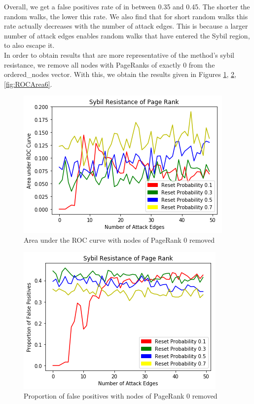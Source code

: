 \documentclass[sigconf]{acmart}
\theoremstyle{definition}
\begin{document}
\noindent Overall, we get a false positives rate of in between 0.35 and 0.45. The shorter the random walks, the lower this rate. We also find that for short random walks this rate actually decreases with the number of attack edges. This is because a larger number of attack edges enables random walks that have entered the Sybil region, to also escape it. \vspace{1em}\\

\noindent In order to obtain results that are more representative of the method's sybil resistance, we remove all nodes with PageRanks of exactly 0 from the ordered\_{}nodes vector. With this, we obtain the results given in Figures \ref{fig:ROCArea4}, \ref{fig:ROCArea5}, \ref{fig:ROCArea6}. 

\begin{figure}
\includegraphics[scale=0.6]{ROCArea4}
\caption{Area under the ROC curve with nodes of PageRank 0 removed}
\label{fig:ROCArea4}
\end{figure}

\begin{figure}
\includegraphics[scale=0.6]{ROCArea5}
\caption{Proportion of false positives with nodes of PageRank 0 removed}
\label{fig:ROCArea5}
\end{figure}
\end{document}
